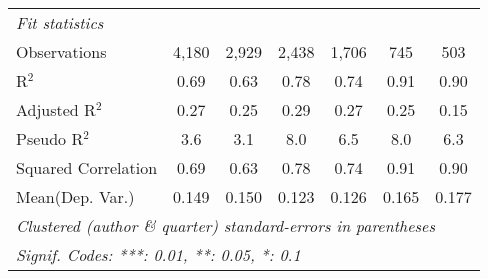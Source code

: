 \begin{tabular}{lcccccc}
   \emph{Fit statistics}\\
   Observations                                               & 4,180   & 2,929        & 2,438   & 1,706   & 745            & 503\\  
   R$^2$                                                      & 0.69    & 0.63         & 0.78    & 0.74    & 0.91           & 0.90\\  
   Adjusted R$^2$                                             & 0.27    & 0.25         & 0.29    & 0.27    & 0.25           & 0.15\\  
   Pseudo R$^2$                                               & 3.6     & 3.1          & 8.0     & 6.5     & 8.0            & 6.3\\  
   Squared Correlation                                        & 0.69    & 0.63         & 0.78    & 0.74    & 0.91           & 0.90\\  
Mean(Dep. Var.) & 0.149 & 0.150 & 0.123 & 0.126 & 0.165 & 0.177 \\
   \midrule \midrule
   \multicolumn{7}{l}{\emph{Clustered (author \& quarter) standard-errors in parentheses}}\\
   \multicolumn{7}{l}{\emph{Signif. Codes: ***: 0.01, **: 0.05, *: 0.1}}\\
\end{tabular}
\par\endgroup
